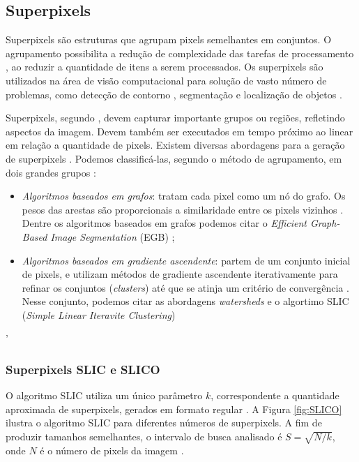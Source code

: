 \begin{document}
\subsection{Superpixels} \label{ssec:super}

Superpixels são estruturas que agrupam pixels semelhantes em conjuntos. O agrupamento possibilita a redução de complexidade das tarefas de processamento \cite{SLIC}, ao reduzir a quantidade de itens a serem processados. Os superpixels são utilizados na área de visão computacional para solução de vasto número de problemas, como detecção de contorno \cite{CONTOUR}, segmentação \cite{SEG_MERGE} e localização de objetos \cite{SEG_LOCALIZ}.

Superpixels, segundo \cite{FELZENSZWALB}, devem capturar importante grupos ou regiões, refletindo aspectos da imagem. Devem também ser executados em tempo próximo ao linear em relação a quantidade de pixels. Existem diversas abordagens para a geração de superpixels \cite{SLIC}. Podemos classificá-las, segundo o método de agrupamento, em dois grandes grupos \cite{SLIC}: 

\begin{itemize}
 \item \textit{Algoritmos baseados em grafos}: tratam cada pixel como um nó do grafo. Os pesos das arestas são proporcionais a similaridade entre os pixels vizinhos \cite{SLIC}. Dentre os algoritmos baseados em grafos podemos citar o \textit{Efficient Graph-Based Image Segmentation} (EGB) \cite{FELZENSZWALB};
 \item \textit{Algoritmos baseados em gradiente ascendente}: partem de um conjunto inicial de pixels, e utilizam métodos de gradiente ascendente iterativamente para refinar os conjuntos (\textit{clusters}) até que se atinja um critério de convergência \cite{SLIC}. Nesse conjunto, podemos  citar as abordagens \textit{watersheds} \cite{WATERSHEDS} e o algortimo SLIC (\textit{Simple Linear Iteravite Clustering}) \cite{SLIC}
\end{itemize}'


\subsubsection{Superpixels SLIC e SLICO} \label{sssec:slic}

O algoritmo SLIC utiliza um único parâmetro $k$, correspondente a quantidade aproximada de superpixels, gerados em formato regular \cite{SLIC}. A Figura \ref{fig:SLICO} ilustra o algoritmo SLIC para diferentes números de superpixels. A fim de produzir tamanhos semelhantes, o intervalo de busca analisado é \mbox{$S=\sqrt{N/k}$}, onde $N$ é o número de pixels da imagem \cite{SLIC}. 
\end{document}
